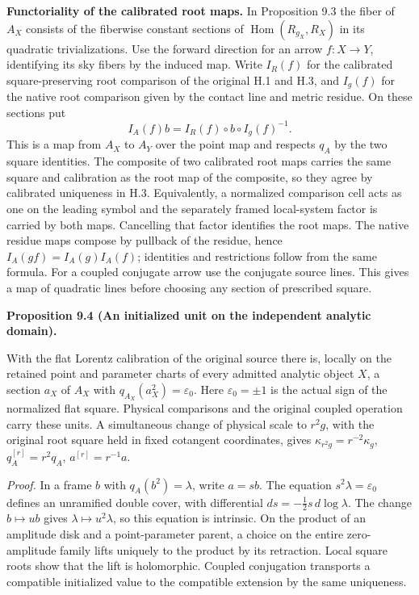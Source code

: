 \documentclass[
  english,
  11pt,
  reqno]{amsart}
\makeatletter
\newcommand{\pandocstatementheading}[1]{%
  \par\addpenalty{\@beginparpenalty}%
  \addvspace{.5\baselineskip plus .2\baselineskip minus .2\baselineskip}%
  {\normalfont\bfseries #1\par}%
  \nobreak\@afterindenttrue\@afterheading
}
\makeatother
\begin{document}
\textbf{Functoriality of the calibrated root maps.} In Proposition 9.3
the fiber of \(A_X\) consists of the fiberwise constant sections of
\(\operatorname{Hom}(R_{g_X},R_X)\) in its quadratic trivializations.
Use the forward direction for an arrow \(f:X\to Y\), identifying its sky
fibers by the induced map. Write \(I_R(f)\) for the calibrated
square-preserving root comparison of the original H.1 and H.3, and
\(I_g(f)\) for the native root comparison given by the contact line and
metric residue. On these sections put \[
I_A(f)b=I_R(f)\circ b\circ I_g(f)^{-1}.
\] This is a map from \(A_X\) to \(A_Y\) over the point map and respects
\(q_A\) by the two square identities. The composite of two calibrated
root maps carries the same square and calibration as the root map of the
composite, so they agree by calibrated uniqueness in H.3. Equivalently,
a normalized comparison cell acts as one on the leading symbol and the
separately framed local-system factor is carried by both maps.
Cancelling that factor identifies the root maps. The native residue maps
compose by pullback of the residue, hence \(I_A(gf)=I_A(g)I_A(f)\);
identities and restrictions follow from the same formula. For a coupled
conjugate arrow use the conjugate source lines. This gives a map of
quadratic lines before choosing any section of prescribed square.

\pandocstatementheading{\leavevmode{}\label{prop:initialized-analytic-unit}Proposition 9.4 (An initialized unit on the independent analytic
domain).}

With the flat Lorentz calibration of the original source there is,
locally on the retained point and parameter charts of every admitted
analytic object \(X\), a section \(a_X\) of \(A_X\) with
\(q_{A_X}(a_X^2)=\varepsilon_0\). Here \(\varepsilon_0=\pm1\) is the
actual sign of the normalized flat square. Physical comparisons and the
original coupled operation carry these units. A simultaneous change of
physical scale to \(r^2g\), with the original root square held in fixed
cotangent coordinates, gives \(\kappa_{r^2g}=r^{-2}\kappa_g\),
\(q_A^{[r]}=r^2q_A\), \(a^{[r]}=r^{-1}a\).

\emph{Proof.} In a frame \(b\) with \(q_A(b^2)=\lambda\), write
\(a=sb\). The equation \(s^2\lambda=\varepsilon_0\) defines an
unramified double cover, with differential
\(ds=-\tfrac12s\,d\log\lambda\). The change \(b\mapsto ub\) gives
\(\lambda\mapsto u^2\lambda\), so this equation is intrinsic. On the
product of an amplitude disk and a point-parameter parent, a choice on
the entire zero-amplitude family lifts uniquely to the product by its
retraction. Local square roots show that the lift is holomorphic.
Coupled conjugation transports a compatible initialized value to the
compatible extension by the same uniqueness.
\end{document}
